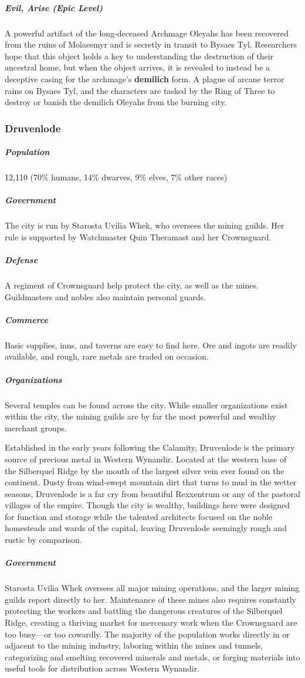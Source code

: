 \documentclass[10pt,a4paper,twoside,bg=print,twocolumn,openany,nodeprecatedcode]{dndbook}
\begin{document}
\subparagraph{Evil, Arise (Epic Level)}
A powerful artifact of the long-deceased Archmage Oleyahs has been recovered from the ruins of Molaesmyr and is secretly in transit to Bysaes Tyl. Researchers hope that this object holds a key to understanding the destruction of their ancestral home, but when the object arrives, it is revealed to instead be a deceptive casing for the archmage's \textbf{demilich} form. A plague of arcane terror rains on Bysaes Tyl, and the characters are tasked by the Ring of Three to destroy or banish the demilich Oleyahs from the burning city.

\subsubsection{Druvenlode}
\subparagraph{Population}
12,110 (70\% humans, 14\% dwarves, 9\% elves, 7\% other races)

\subparagraph{Government}
The city is run by Starosta Uvilia Whek, who oversees the mining guilds. Her rule is supported by Watchmaster Quin Theramast and her Crownsguard.

\subparagraph{Defense}
A regiment of Crownsguard help protect the city, as well as the mines. Guildmasters and nobles also maintain personal guards.

\subparagraph{Commerce}
Basic supplies, inns, and taverns are easy to find here. Ore and ingots are readily available, and rough, rare metals are traded on occasion.

\subparagraph{Organizations}
Several temples can be found across the city. While smaller organizations exist within the city, the mining guilds are by far the most powerful and wealthy merchant groups.

Established in the early years following the Calamity, Druvenlode is the primary source of precious metal in Western Wynandir. Located at the western base of the Silberquel Ridge by the mouth of the largest silver vein ever found on the continent. Dusty from wind-swept mountain dirt that turns to mud in the wetter seasons, Druvenlode is a far cry from beautiful Rexxentrum or any of the pastoral villages of the empire. Though the city is wealthy, buildings here were designed for function and storage while the talented architects focused on the noble homesteads and wards of the capital, leaving Druvenlode seemingly rough and rustic by comparison.

\subparagraph{Government}
Starosta Uvilia Whek oversees all major mining operations, and the larger mining guilds report directly to her. Maintenance of these mines also requires constantly protecting the workers and battling the dangerous creatures of the Silberquel Ridge, creating a thriving market for mercenary work when the Crownsguard are too busy—or too cowardly. The majority of the population works directly in or adjacent to the mining industry, laboring within the mines and tunnels, categorizing and smelting recovered minerals and metals, or forging materials into useful tools for distribution across Western Wynandir.
\end{document}

